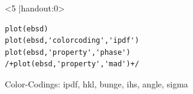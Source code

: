\begin{frame}[fragile]
\begin{columns}
\begin{column}{8.5cm}
\begin{onlyenv}<5 |handout:0>
\begin{lstlisting}
plot(ebsd)
plot(ebsd,'colorcoding','ipdf')
plot(ebsd,'property','phase')
/+plot(ebsd,'property','mad')+/
\end{lstlisting}
\end{onlyenv}

      Color-Codings: ipdf, hkl, bunge, ihs, angle, sigma

    \end{column}

    \begin{column}{3.5cm}
\end{column}
\end{columns}
\end{frame}
